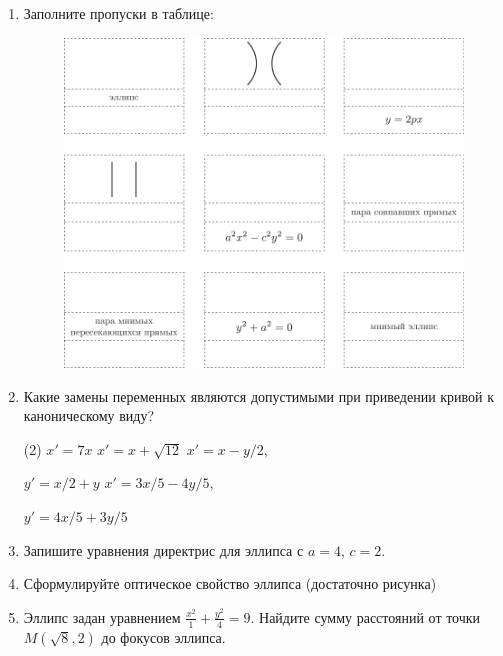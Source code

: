 \begin{enumerate}
	\item Заполните пропуски в таблице:
	\begin{figure}[ht]
		\centering
		\includegraphics{1}
	\end{figure}
	
	\item Какие замены переменных являются допустимыми при приведении кривой к каноническому виду?
	\begin{tasks}(2)
		\task $x' = 7x$	
		\task $x' = x + \sqrt{12}$
		\task $x' = x - y/2$,
		
		 	  $y' = x/2 + y$
		\task $x' = 3x/5 - 4y/5$,
	
		$y' = 4x/5 + 3y/5$

	\end{tasks}
	
	\item Запишите уравнения директрис для эллипса с $a=4$, $c=2$.
	\newpage
	\item Сформулируйте оптическое свойство эллипса (достаточно рисунка)
	\vspace{5cm}
	\item Эллипс задан уравнением $\frac{x^2}{1} + \frac{y^2}{4} = 9$. Найдите сумму расстояний от точки $M(\sqrt{8}, 2)$ до фокусов эллипса.

\end{enumerate}